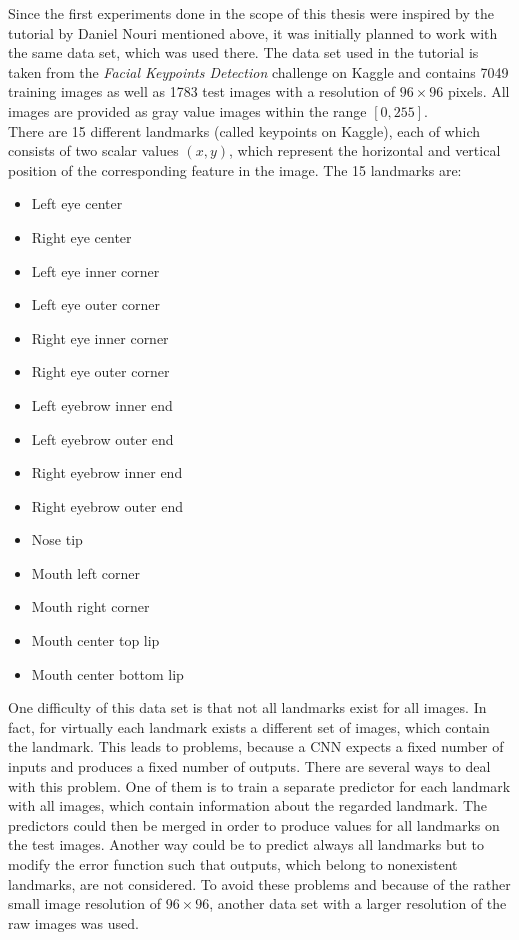 \documentclass[11pt, a4paper]{article}
\begin{document}
Since the first experiments done in the scope of this thesis were inspired by the tutorial by Daniel Nouri mentioned above, it was initially planned to work with the same data set, which was used there. The data set used in the tutorial is taken from the \emph{Facial Keypoints Detection} challenge on Kaggle and contains 7049 training images as well as 1783 test images with a resolution of $96 \times 96$ pixels. All images are provided as gray value images within the range $[0,255]$.\\
There are 15 different landmarks (called keypoints on Kaggle), each of which consists of two scalar values $(x,y)$, which represent the horizontal and vertical position of the corresponding feature in the image. The 15 landmarks are:
\vspace{-0.2cm}
\begin{multicols}{2}
	\begin{itemize}[itemsep=-2ex]
		\item Left eye center
		\item Right eye center
		\item Left eye inner corner
		\item Left eye outer corner
		\item Right eye inner corner
		\item Right eye outer corner
		\item Left eyebrow inner end
		\item Left eyebrow outer end
	\end{itemize}
\columnbreak
	\begin{itemize}[itemsep=-2ex]
		\item Right eyebrow inner end
		\item Right eyebrow outer end
		\item Nose tip
		\item Mouth left corner
		\item Mouth right corner
		\item Mouth center top lip
		\item Mouth center bottom lip
	\end{itemize}
	\vphantom{}
\end{multicols}
\vspace{-0.5cm}
One difficulty of this data set is that not all landmarks exist for all images. In fact, for virtually each landmark exists a different set of images, which contain the landmark. This leads to problems, because a \ac{CNN} expects a fixed number of inputs and produces a fixed number of outputs. There are several ways to deal with this problem. One of them is to train a separate predictor for each landmark with all images, which contain information about the regarded landmark. The predictors could then be merged in order to produce values for all landmarks on the test images. Another way could be to predict always all landmarks but to modify the error function such that outputs, which belong to nonexistent landmarks, are not considered. To avoid these problems and because of the rather small image resolution of $96 \times 96$, another data set with a larger resolution of the raw images was used.
\end{document}
